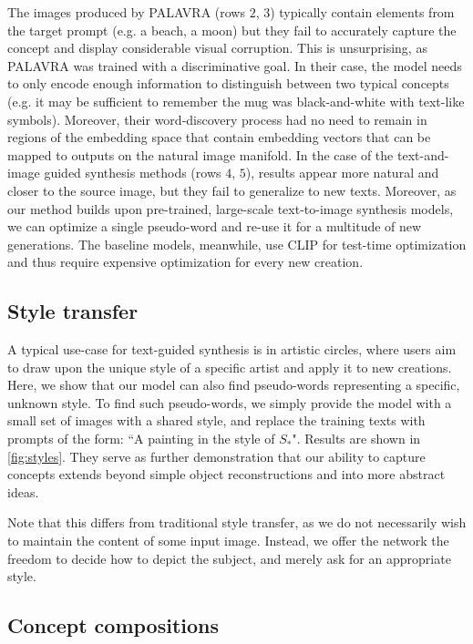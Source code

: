 The images produced by PALAVRA (rows $2$, $3$) typically contain elements from the target prompt (e.g. a beach, a moon) but they fail to accurately capture the concept and display considerable visual corruption. This is unsurprising, as PALAVRA was trained with a discriminative goal. In their case, the model needs to only encode enough information to distinguish between two typical concepts (e.g. it may be sufficient to remember the mug was black-and-white with text-like symbols). Moreover, their word-discovery process had no need to remain in regions of the embedding space that contain embedding vectors that can be mapped to outputs on the natural image manifold. In the case of the text-and-image guided synthesis methods (rows $4$, $5$), results appear more natural and closer to the source image, but they fail to generalize to new texts. Moreover, as our method builds upon pre-trained, large-scale text-to-image synthesis models, we can optimize a single pseudo-word and re-use it for a multitude of new generations. The baseline models, meanwhile, use CLIP for test-time optimization and thus require expensive optimization for every new creation.

\subsection{Style transfer}

A typical use-case for text-guided synthesis is in artistic circles, where users aim to draw upon the unique style of a specific artist and apply it to new creations. Here, we show that our model can also find pseudo-words representing a specific, unknown style. To find such pseudo-words, we simply provide the model with a small set of images with a shared style, and replace the training texts with prompts of the form: ``A painting in the style of {\color{blue}$S_*$}". Results are shown in \ref{fig:styles}. They serve as further demonstration that our ability to capture concepts extends beyond simple object reconstructions and into more abstract ideas.

Note that this differs from traditional style transfer, as we do not necessarily wish to maintain the content of some input image. Instead, we offer the network the freedom to decide how to depict the subject, and merely ask for an appropriate style.

\subsection{Concept compositions}

